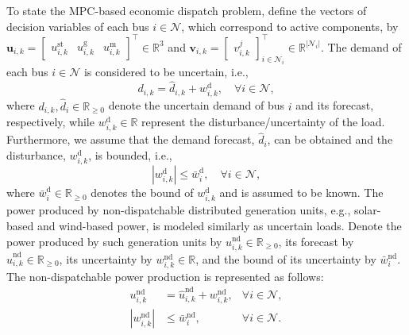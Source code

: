 To state the MPC-based economic dispatch problem, define the vectors of decision variables of each bus $i\in \mathcal{N}$, which correspond to active components, by $\bm{u}_{i,k} = \begin{bmatrix}
u^{\mathrm{st}}_{i,k} & u^{\mathrm{g}}_{i,k}  & u^{\mathrm{m}}_{i,k}
\end{bmatrix}^{\top} \in \mathbb{R}^{3}$ and $\bm{v}_{i,k} = \begin{bmatrix}
v_{i,k}^{j}
\end{bmatrix}_{i\in \mathcal{N}_i}^{\top} \in \mathbb{R}^{|\mathcal{N}_i|}$. 
\iffalse  
The demand of each bus $i\in\mathcal{N}$ is considered to be uncertain, i.e.,
\begin{equation}
{d}_{i,k}=\hat{d}_{i,k} + w_{i,k}^{\mathrm{d}}, \quad \forall i \in \mathcal{N}, \label{eq:ul}
\end{equation}
where  ${d}_{i,k}, \hat{d}_{i} \in \mathbb{R}_{\geq 0}$ denote the uncertain demand of bus $i$ and its forecast, respectively, while  $w_{i,k}^{\mathrm{d}} \in \mathbb{R}$ represent the disturbance/uncertainty of the load. Furthermore, we assume that the demand forecast, $\hat{d}_{i}$, can be obtained and  the disturbance, $w_{i,k}^{\mathrm{d}}$, is bounded, i.e.,
\begin{equation}
|w_{i,k}^{\mathrm{d}}| \leq \bar{w}_{i}^{\mathrm{d}}, \quad \forall i \in \mathcal{N}, \label{eq:w_ul}
\end{equation}
where $\bar{w}_{i}^{\mathrm{d}} \in \mathbb{R}_{\geq 0}$ denotes the bound of $w_{i,k}^{\mathrm{d}}$ and is assumed to be known. 
The power produced by non-dispatchable distributed generation units, e.g.,  solar-based and wind-based power, is modeled similarly as uncertain loads. Denote the power produced by such generation units by ${u}_{i,k}^{\mathrm{nd}}\in \mathbb{R}_{\geq 0}$, its forecast by $\hat{u}_{i,k}^{\mathrm{nd}} \in \mathbb{R}_{\geq 0}$, its uncertainty by $w_{i,k}^{\mathrm{nd}} \in \mathbb{R}$, and the bound of its uncertainty by $\bar{w}_{i}^{\mathrm{nd}}$. The non-dispatchable power production is represented as follows:
\begin{align}
{u}_{i,k}^{\mathrm{nd}}&=\hat{u}_{i,k}^{\mathrm{nd}} + w_{i,k}^{\mathrm{nd}},  &\forall i \in \mathcal{N}, \label{eq:re}\\
|w_{i,k}^{\mathrm{nd}}| &\leq \bar{w}_{i}^{\mathrm{nd}} ,  &\forall i \in \mathcal{N}. \label{eq:w_re}
\end{align}
